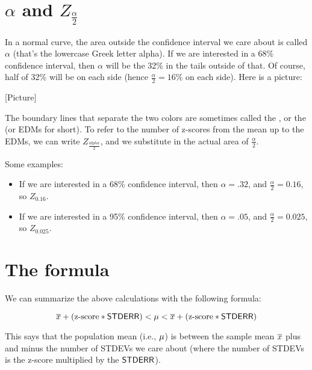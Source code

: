 \documentclass[../../../main.tex]{subfiles}
\begin{document}
\section{$\alpha$ and $Z_{\frac{\alpha}{2}}$}

In a normal curve, the area outside the confidence interval we care about is called $\alpha$ (that's the lowercase Greek letter alpha). If we are interested in a 68\% confidence interval, then $\alpha$ will be the 32\% in the tails outside of that. Of course, half of 32\% will be on each side (hence $\frac{\alpha}{2} = 16\%$ on each side). Here is a picture:

    [Picture]

\noindent
The boundary lines that separate the two colors are sometimes called the , or the  (or EDMs for short). To refer to the number of z-scores from the mean up to the EDMs, we can write $Z_{\frac{alpha}{2}}$, and we substitute in the actual area of $\frac{\alpha}{2}$. 

Some examples:

\begin{itemize}
  \item If we are interested in a 68\% confidence interval, then $\alpha = .32$, and $\frac{\alpha}{2} = 0.16$, so $Z_{0.16}$.
  \item If we are interested in a 95\% confidence interval, then $\alpha = .05$, and $\frac{\alpha}{2} = 0.025$, so $Z_{0.025}$.
\end{itemize}


\section{The formula}

We can summarize the above calculations with the following formula:

\begin{equation*}
  \samplemean{x} + (\text{z-score} * \StdErr/) < \populationmean < \samplemean{x} + (\text{z-score}* \StdErr/)
\end{equation*}

\noindent
This says that the population mean (i.e., $\mu$) is between the sample mean $\overline{x}$ plus and minus the number of STDEVs we care about (where the number of STDEVs is the z-score multiplied by the $\StdErr/$).
\end{document}
